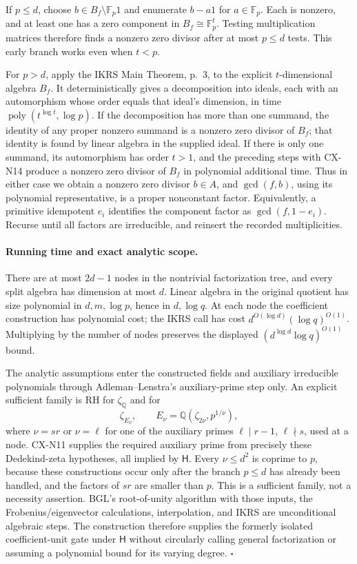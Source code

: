 \documentclass[11pt,a4paper]{article}
\begin{document}
If \(p\leq d\), choose \(b\in B_f\setminus\mathbb F_p1\)
and enumerate \(b-a1\) for \(a\in\mathbb F_p\).
Each is nonzero, and at least one has a zero component in
\(B_f\cong\mathbb F_p^t\).
Testing multiplication matrices therefore finds a nonzero zero
divisor after at most \(p\leq d\) tests.
This early branch works even when \(t<p\).

For \(p>d\), apply the IKRS Main Theorem, p.~3, to the explicit
\(t\)-dimensional algebra \(B_f\).
It deterministically gives a decomposition into ideals, each
with an automorphism whose order equals that ideal's dimension,
in time \(\operatorname{poly}(t^{\log t},\log p)\).
If the decomposition has more than one summand, the identity of
any proper nonzero summand is a nonzero zero divisor of \(B_f\);
that identity is found by linear algebra in the supplied ideal.
If there is only one summand, its automorphism has order
\(t>1\), and the preceding steps with CX-N14 produce a nonzero
zero divisor of \(B_f\) in polynomial additional time.
Thus in either case we obtain a nonzero zero divisor \(b\in A\),
and \(\gcd(f,b)\), using its polynomial representative, is a
proper nonconstant factor.
Equivalently, a primitive idempotent \(e_i\) identifies the
component factor as \(\gcd(f,1-e_i)\).
Recurse until all factors are irreducible, and reinsert the
recorded multiplicities.

\paragraph{Running time and exact analytic scope.}
There are at most \(2d-1\) nodes in the nontrivial factorization
tree, and every split algebra has dimension at most \(d\).
Linear algebra in the original quotient has size polynomial in
\(d,m,\log p\), hence in \(d,\log q\).
At each node the coefficient construction has polynomial cost;
the IKRS call has cost
\(d^{O(\log d)}(\log q)^{O(1)}\).
Multiplying by the number of nodes preserves the displayed
\((d^{\log d}\log q)^{O(1)}\) bound.

The analytic assumptions enter the constructed fields and
auxiliary irreducible polynomials through Adleman--Lenstra's
auxiliary-prime step only.
An explicit sufficient family is RH for \(\zeta_{\mathbb Q}\)
and for
\[
 \zeta_{E_\nu},\qquad
 E_\nu=\mathbb Q(\zeta_{2\nu},p^{1/\nu}),
\]
where \(\nu=sr\) or \(\nu=\ell\) for one of the auxiliary
primes \(\ell\mid r-1\), \(\ell\nmid s\), used at a node.
CX-N11 supplies the required auxiliary prime from precisely
these Dedekind-zeta hypotheses, all implied by \(\mathsf H\).
Every \(\nu\leq d^2\) is coprime to \(p\), because these
constructions occur only after the branch \(p\leq d\) has
already been handled, and the factors of \(sr\) are smaller
than \(p\).
This is a sufficient family, not a necessity assertion.
BGL's root-of-unity algorithm with those inputs, the
Frobenius/eigenvector calculations, interpolation, and IKRS
are unconditional algebraic steps.
The construction therefore supplies the formerly isolated
coefficient-unit gate under \(\mathsf H\) without circularly
calling general factorization or assuming a polynomial bound
for its varying degree.
\hfill\(\square\)
\end{document}
